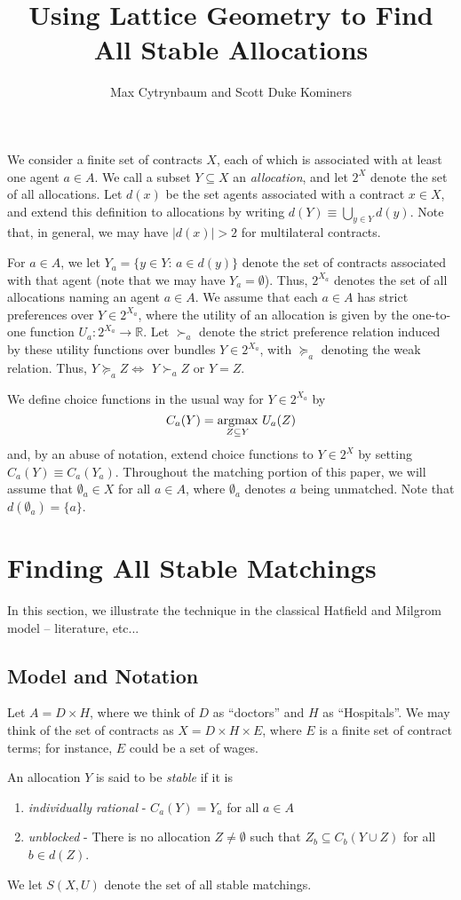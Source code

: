 \documentclass[11pt,reqno]{amsart}
\title{Using Lattice Geometry to Find All Stable Allocations}
\author{Max Cytrynbaum and Scott Duke Kominers}
\theoremstyle{definition}
\numberwithin{equation}{section}
\newcommand{\mr}{\mathbb{R}}
\newcommand{\argmax}{\operatornamewithlimits{argmax}}
\newcommand{\sub}{\subseteq}
\newcommand{\suq}{\succeq}
\newcommand{\su}{\succ}
\begin{document}
\maketitle

We consider a finite set of contracts $X$, each of which is associated with at least one agent $a\in A$. 
We call a subset $Y\sub X$ an \emph{allocation}, and let $2^X$ denote the set of all allocations. 
Let $d(x)$ be the set agents associated with a contract $x\in X$, and extend this definition to allocations by writing $d(Y) \equiv \bigcup_{y\in Y} d(y)$.
Note that, in general, we may have $|d(x)| > 2$ for multilateral contracts.

For $a\in A$, we let $Y_a = \{y\in Y: \, a\in d(y)\}$ denote the set of contracts associated with that agent (note that we may have $Y_a = \emptyset$). Thus, $2^{X_a}$ denotes the set of all allocations naming an agent $a\in A$. 
We assume that each $a\in A$ has strict preferences over $Y \in 2^{X_a}$, where the utility of an allocation is given by the one-to-one function $U_a: 2^{X_a} \to \mr$.
Let $\su_a$ denote the strict preference relation induced by these utility functions over bundles $Y \in 2^{X_a}$, with $\suq_a$ denoting the weak relation. Thus, $Y \suq_a  Z \iff$ $Y \su_a Z$ or $Y = Z$.

We define choice functions in the usual way for $Y\in 2^{X_a}$ by 
\[
C_a(Y) = \argmax_{Z\subseteq Y} \, U_a(Z)
\]
and, by an abuse of notation, extend choice functions to $Y\in 2^X$ by setting $C_a(Y) \equiv C_a(Y_a)$.
Throughout the matching portion of this paper, we will assume that $\emptyset_a \in X$ for all $a \in A$, where $\emptyset_a$ denotes $a$ being unmatched. Note that $d(\emptyset_a) = \{a\}$. 
\section{Finding All Stable Matchings} 
In this section, we illustrate the technique in the classical Hatfield and Milgrom model -- literature, etc... 
\subsection{Model and Notation} 
Let $A = D\times H$, where we think of $D$ as ``doctors'' and $H$ as ``Hospitals''. We may think of the set of contracts as $X = D\times H \times E$, where $E$ is a finite set of contract terms; for instance, $E$ could be a set of wages.

An allocation $Y$ is said to be \emph{stable} if it is 
\begin{enumerate}
\item \emph{individually rational} - $C_a(Y) = Y_a$ for all $a \in A$
\item \emph{unblocked} - There is no allocation $Z \not = \emptyset$ such that $Z_b \sub C_b(Y\cup Z)$ for all $b \in d(Z)$. 
\end{enumerate}
We let $S(X,U)$ denote the set of all stable matchings.
\end{document}
